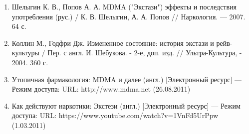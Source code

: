 \documentclass[a4paper,14pt,russian]{report}
\begin{document}
\begin{enumerate}
  \item Шелыгин К. В., Попов А. А. MDMA ("Экстази") эффекты и последствия употребления (рус.) / К. В. Шелыгин, А. А. Попов // Наркология. — 2007. 64 с.
  \item Коллин М., Годфри Дж. Измененное состояние: история экстази и рейв-культуры / Пер. с англ. И. Шебукова. - 2-е, доп. изд. // Ультра-Культура, - 2004. 360 с.
  \item Утопичная фармакология: MDMA и далее (англ.) [Электронный ресурс] — Режим доступа: URL: http://www.mdma.net (26.08.2011)
  \item Как действуют наркотики: Экстези (англ.) [Электронный ресурс] — Режим доступа: URL: https://www.youtube.com/watch?v=1VnFd5UrPpw (1.03.2011)
\end{enumerate}
\end{document}
